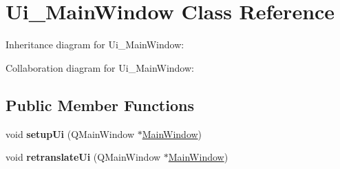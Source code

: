 \hypertarget{class_ui___main_window}{}\section{Ui\+\_\+\+Main\+Window Class Reference}
\label{class_ui___main_window}


Inheritance diagram for Ui\+\_\+\+Main\+Window\+:


Collaboration diagram for Ui\+\_\+\+Main\+Window\+:
\subsection*{Public Member Functions}
\begin{DoxyCompactItemize}
\item 
void {\bfseries setup\+Ui} (Q\+Main\+Window $\ast$\hyperlink{class_main_window}{Main\+Window})\hypertarget{class_ui___main_window_acf4a0872c4c77d8f43a2ec66ed849b58}{}\label{class_ui___main_window_acf4a0872c4c77d8f43a2ec66ed849b58}

\item 
void {\bfseries retranslate\+Ui} (Q\+Main\+Window $\ast$\hyperlink{class_main_window}{Main\+Window})\hypertarget{class_ui___main_window_a097dd160c3534a204904cb374412c618}{}\label{class_ui___main_window_a097dd160c3534a204904cb374412c618}

\end{DoxyCompactItemize}
